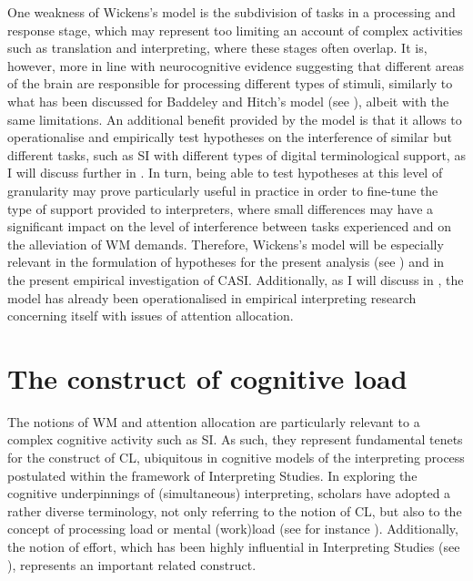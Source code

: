 One weakness of Wickens's model is the subdivision of tasks in a processing and response stage, which may represent too limiting an account of complex activities such as translation and interpreting, where these stages often overlap. It is, however, more in line with neurocognitive evidence suggesting that different areas of the brain are responsible for processing different types of stimuli, similarly to what has been discussed for Baddeley and Hitch's model (see ), albeit with the same limitations. An additional benefit provided by the model is that it allows to operationalise and empirically test hypotheses on the interference of similar but different tasks, such as SI with different types of digital terminological support, as I will discuss further in . In turn, being able to test hypotheses at this level of granularity may prove particularly useful in practice in order to fine-tune the type of support provided to interpreters, where small differences may have a significant impact on the level of interference between tasks experienced and on the alleviation of WM demands. Therefore, Wickens's model will be especially relevant in the formulation of hypotheses for the present analysis (see ) and in the present empirical investigation of CASI. Additionally, as I will discuss in , the model has already been operationalised in empirical interpreting research concerning itself with issues of attention allocation.

\section{The construct of cognitive load} \label{CL}
The notions of WM and attention allocation are particularly relevant to a complex cognitive activity such as SI. As such, they represent fundamental tenets for the construct of CL, ubiquitous in cognitive models of the interpreting process postulated within the framework of Interpreting Studies. In exploring the cognitive underpinnings of (simultaneous) interpreting, scholars have adopted a rather diverse terminology, not only referring to the notion of CL, but also to the concept of processing load or mental (work)load (see for instance \citealt{gieshoff_impact_2018}). Additionally, the notion of effort, which has been highly influential in Interpreting Studies (see ), represents an important related construct.

